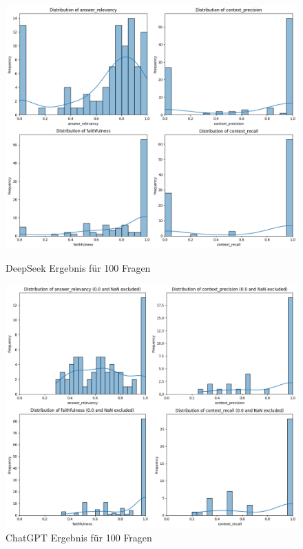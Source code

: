 \begin{figure}[htbp]
    \centering
    \begin{minipage}[b]{0.48\textwidth}
        \centering
        \includegraphics[width=\textwidth]{images/20_4_D_D_distribution.png}
        \caption{DeepSeek Ergebnis für 100 Fragen}
        \label{fig:deepseek}
    \end{minipage}
    \hfill
    \begin{minipage}[b]{0.48\textwidth}
        \centering
        \includegraphics[width=\textwidth]{images/127_38_O_O_distribution.png}
        \caption{ChatGPT Ergebnis für 100 Fragen}
        \label{fig:chatgpt}
    \end{minipage}
\end{figure}


